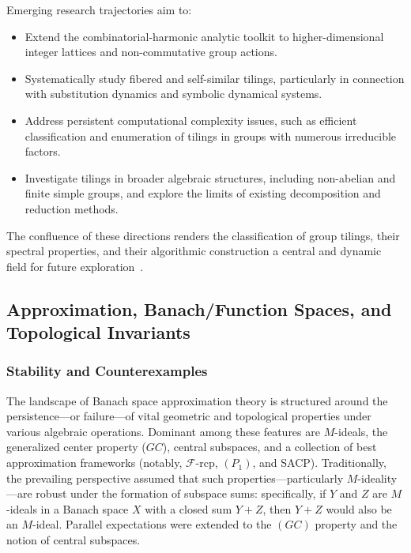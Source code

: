 \documentclass[sigconf]{acmart}
\begin{document}
Emerging research trajectories aim to:

\begin{itemize}
    \item Extend the combinatorial-harmonic analytic toolkit to higher-dimensional integer lattices and non-commutative group actions.
    \item Systematically study fibered and self-similar tilings, particularly in connection with substitution dynamics and symbolic dynamical systems.
    \item Address persistent computational complexity issues, such as efficient classification and enumeration of tilings in groups with numerous irreducible factors.
    \item Investigate tilings in broader algebraic structures, including non-abelian and finite simple groups, and explore the limits of existing decomposition and reduction methods.
\end{itemize}

The confluence of these directions renders the classification of group tilings, their spectral properties, and their algorithmic construction a central and dynamic field for future exploration~\cite{ref101}.

\subsection{Approximation, Banach/Function Spaces, and Topological Invariants}

\subsubsection{Stability and Counterexamples}

The landscape of Banach space approximation theory is structured around the persistence—or failure—of vital geometric and topological properties under various algebraic operations. Dominant among these features are $M$-ideals, the generalized center property ($GC$), central subspaces, and a collection of best approximation frameworks (notably, $\mathscr{F}$-rcp, $(P_1)$, and SACP). Traditionally, the prevailing perspective assumed that such properties—particularly $M$-ideality—are robust under the formation of subspace sums: specifically, if $Y$ and $Z$ are $M$-ideals in a Banach space $X$ with a closed sum $Y + Z$, then $Y + Z$ would also be an $M$-ideal. Parallel expectations were extended to the $(GC)$ property and the notion of central subspaces.
\end{document}
